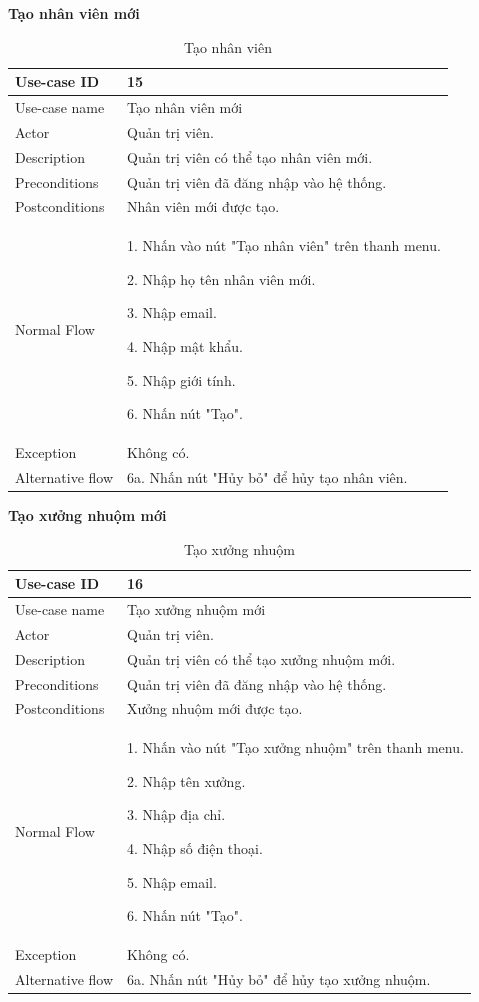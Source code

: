 \newpage
\textbf{Tạo nhân viên mới}
\begin{table}[!htp]
    \centering
    \begin{tabular}{|m{3cm}|m{10cm}|}
    \hline 
        Use-case ID & 15\\ \hline
        Use-case name & Tạo nhân viên mới\\ \hline
        Actor & Quản trị viên.\\ \hline
        Description & Quản trị viên có thể tạo nhân viên mới.\\ \hline
        Preconditions & Quản trị viên đã đăng nhập vào hệ thống.\\ \hline
        Postconditions & Nhân viên mới được tạo.\\ \hline
        Normal Flow & 
        1. Nhấn vào nút "Tạo nhân viên" trên thanh menu.\par 
        2. Nhập họ tên nhân viên mới.\par
        3. Nhập email.\par
        4. Nhập mật khẩu.\par
        5. Nhập giới tính.\par
        6. Nhấn nút "Tạo".
        \\ \hline
        Exception & Không có.
        \\ \hline
        Alternative flow & 
        6a. Nhấn nút "Hủy bỏ" để hủy tạo nhân viên.
        \\ 
    \hline 
    \end{tabular}
    \caption{Tạo nhân viên}
    \label{bang15}
\end{table}

\textbf{Tạo xưởng nhuộm mới}
\begin{table}[!htp]
    \centering
    \begin{tabular}{|m{3cm}|m{10cm}|}
    \hline 
        Use-case ID & 16\\ \hline
        Use-case name & Tạo xưởng nhuộm mới\\ \hline
        Actor & Quản trị viên.\\ \hline
        Description & Quản trị viên có thể tạo xưởng nhuộm mới.\\ \hline
        Preconditions & Quản trị viên đã đăng nhập vào hệ thống.\\ \hline
        Postconditions & Xưởng nhuộm mới được tạo.\\ \hline
        Normal Flow & 
        1. Nhấn vào nút "Tạo xưởng nhuộm" trên thanh menu.\par 
        2. Nhập tên xưởng.\par
        3. Nhập địa chỉ.\par
        4. Nhập số điện thoại.\par
        5. Nhập email.\par
        6. Nhấn nút "Tạo".
        \\ \hline
        Exception & Không có.
        \\ \hline
        Alternative flow & 
        6a. Nhấn nút "Hủy bỏ" để hủy tạo xưởng nhuộm.
        \\ 
    \hline 
    \end{tabular}
    \caption{Tạo xưởng nhuộm}
    \label{bang16}
\end{table}

